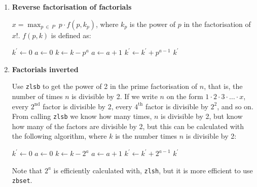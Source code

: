 \begin{enumerate}[label=\textbf{\arabic*}.]
\item \textbf{Reverse factorisation of factorials}

$\displaystyle{x = \max_{p ~\in~ P} ~ p \cdot f(p, k_p)}$,
where $k_p$ is the power of $p$ in the factorisation
of $x!$. $f(p, k)$ is defined as:

\vspace{1em}
\hspace{-2.8ex}
\begin{minipage}{\linewidth}
\begin{algorithmic}
    \STATE $k^\prime \gets 0$
      \STATE $a \gets 0$
        \STATE $k \gets k - p^a$
        \STATE $a \gets a + 1$
      \ENDWHILE
      \STATE $k^\prime \gets k^\prime + p^{a - 1}$
    \ENDWHILE
    \RETURN $k^\prime$
\end{algorithmic}
\end{minipage}
\vspace{1em}



\item \textbf{Factorials inverted}

Use \texttt{zlsb} to get the power of 2 in the
prime factorisation of $n$, that is, the number
of times $n$ is divisible by 2. If we write $n$ on
the form $1 \cdot 2 \cdot 3 \cdot \ldots \cdot x$,
every $2^\text{nd}$ factor is divisible by 2, every
$4^\text{th}$ factor is divisible by $2^2$, and so on.
From calling \texttt{zlsb} we know how many times,
$n$ is divisible by 2, but know how many of the factors
are divisible by 2, but this can be calculated with
the following algorithm, where $k$ is the number
times $n$ is divisible by 2:

\vspace{1em}
\hspace{-2.8ex}
\begin{minipage}{\linewidth}
\begin{algorithmic}
    \STATE $k^\prime \gets 0$
      \STATE $a \gets 0$
        \STATE $k \gets k - 2^a$
        \STATE $a \gets a + 1$
      \ENDWHILE
      \STATE $k^\prime \gets k^\prime + 2^{a - 1}$
    \ENDWHILE
    \RETURN $k^\prime$
\end{algorithmic}
\end{minipage}
\vspace{1em}

\noindent
Note that $2^a$ is efficiently calculated with,
\texttt{zlsh}, but it is more efficient to use
\texttt{zbset}.


\end{enumerate}
